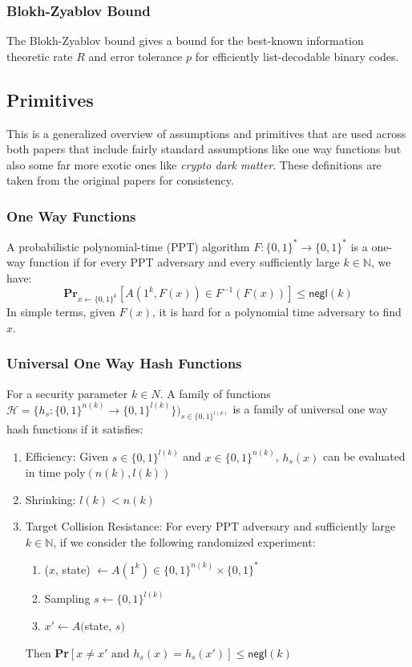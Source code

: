 \documentclass[12pt]{article}%
\newcommand{\N}{\mathbb{N}}
\begin{document}
\subsubsection{Blokh-Zyablov Bound}
The Blokh-Zyablov bound gives a bound for the best-known information theoretic rate $R$ and error tolerance $p$ for efficiently list-decodable binary codes. 


\subsection{Primitives}
This is a generalized overview of assumptions and primitives that are used across both papers that include fairly standard assumptions like one way functions but also some far more exotic ones like \textit{crypto dark matter}. These definitions are taken from the original papers for consistency. 

\subsubsection{One Way Functions}

A probabilistic polynomial-time (PPT) algorithm $F:\{0, 1\}^* \to \{0, 1\}^*$ is a one-way function if for every PPT adversary and every sufficiently large $k \in \N$, we have: $$\textbf{Pr}_{x \xleftarrow{} \{0, 1\}^k}[A(1^k, F(x)) \in F^{-1}(F(x))] \leq \textsf{negl}(k)$$ In simple terms, given $F(x)$, it is hard for a polynomial time adversary to find $x$. 

\subsubsection{Universal One Way Hash Functions}

For a security parameter $k \in N$. A family of functions $\mathcal{H} = \{h_s: \{0, 1\}^{n(k) } \to \{0, 1\}^{l(k)}\})_{s \in \{0, 1\}^{l(k)}}$ is a family of universal one way hash functions if it satisfies: \begin{enumerate}
    \item Efficiency: Given $s \in \{0, 1\}^{l(k)}$ and $x \in \{0, 1\}^{n(k)}$, $h_s(x)$ can be evaluated in time poly$(n(k), l(k))$
    \item Shrinking: $l(k) < n(k)$
    \item Target Collision Resistance: For every PPT adversary and sufficiently large $k \in \N$, if we consider the following randomized experiment: \begin{enumerate}
        \item ($x$, state) $\xleftarrow{} A(1^k) \in \{0, 1\}^{n(k)} \times \{0, 1\}^*$
        \item Sampling $s \xleftarrow{} \{0, 1\}^{l(k)}$
        \item $x' \xleftarrow{} A($state, $s)$
    \end{enumerate} Then \textbf{Pr}$[x \neq x' \text{ and } h_s(x) = h_s(x')] \leq \textsf{negl}(k)$
\end{enumerate}
\end{document}
